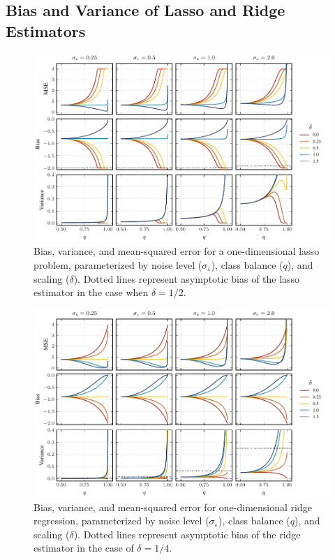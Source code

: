 \subsection{Bias and Variance of Lasso and Ridge Estimators}%
\label{sec:additional-results-biasvar}

\begin{figure}[htpb]
  \centering
  \includegraphics[]{plots/binary_onedim_bias_var_lasso.pdf}
  \caption{%
    Bias, variance, and mean-squared error for a one-dimensional lasso problem,
    parameterized by noise level (\(\sigma_\varepsilon\)), class balance (\(q\)), and
    scaling (\(\delta\)). Dotted lines represent asymptotic bias of the lasso
    estimator in the case when \(\delta = 1/2\).}
  \label{fig:bias-var-onedim-lasso-full}
\end{figure}

\begin{figure}[htpb]
  \centering
  \includegraphics[]{plots/binary_onedim_bias_var_ridge.pdf}
  \caption{%
    Bias, variance, and mean-squared error for one-dimensional ridge regression,
    parameterized by noise level (\(\sigma_\varepsilon\)), class balance (\(q\)), and
    scaling (\(\delta\)). Dotted lines represent asymptotic bias of the ridge
    estimator in the case of \(\delta = 1/4\).}
  \label{fig:bias-var-onedim-ridge-full}
\end{figure}

